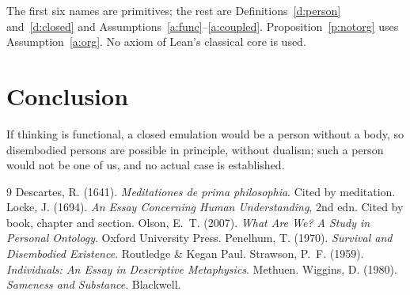 \documentclass{situationist-preprint}
\begin{document}
\noindent The first six names are primitives; the rest are Definitions~\ref{d:person} and~\ref{d:closed} and Assumptions~\ref{a:func}--\ref{a:coupled}. Proposition~\ref{p:notorg} uses Assumption~\ref{a:org}. No axiom of Lean's classical core is used.

\section{Conclusion}

If thinking is functional, a closed emulation would be a person without a body, so disembodied persons are possible in principle, without dualism; such a person would not be one of us, and no actual case is established.

\begin{thebibliography}{9}\small
{} Descartes, R. (1641). \emph{Meditationes de prima philosophia}. Cited by meditation.
 Locke, J. (1694). \emph{An Essay Concerning Human Understanding}, 2nd edn. Cited by book, chapter and section.
 Olson, E.~T. (2007). \emph{What Are We? A Study in Personal Ontology}. Oxford University Press.
 Penelhum, T. (1970). \emph{Survival and Disembodied Existence}. Routledge \& Kegan Paul.
 Strawson, P.~F. (1959). \emph{Individuals: An Essay in Descriptive Metaphysics}. Methuen.
 Wiggins, D. (1980). \emph{Sameness and Substance}. Blackwell.
\end{thebibliography}
\end{document}
